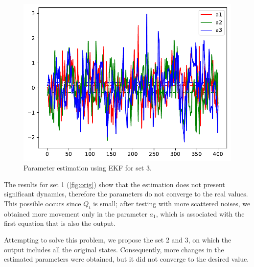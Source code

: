 \begin{figure}
  \centering
  \includegraphics[scale=.4]{files/chinese_estimation_2.pdf}
  \caption{Parameter estimation using EKF for set 3.}
  \label{fig:estimation2}
\end{figure}

The results for set 1 (\cref{fig:orig}) show that the estimation does not present significant dynamics, therefore the parameters do not converge to the real values. This possible occurs since $Q_t$ is small; after testing with more scattered noises, we obtained more movement only in the parameter $a_1$, which is associated with the first equation that is also the output.


Attempting to solve this problem, we propose the set 2 and 3, on which the output includes all the original states. Consequently, more changes in the estimated parameters were obtained, but it did not converge to the desired value.

